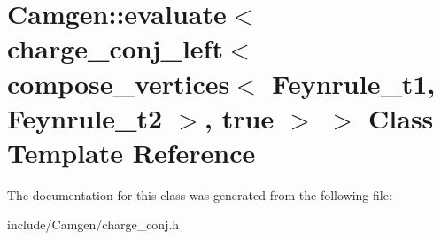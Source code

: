 \hypertarget{a00146}{}\section{Camgen\+:\+:evaluate$<$ charge\+\_\+conj\+\_\+left$<$ compose\+\_\+vertices$<$ Feynrule\+\_\+t1, Feynrule\+\_\+t2 $>$, true $>$ $>$ Class Template Reference}
\label{a00146}


The documentation for this class was generated from the following file\+:\begin{DoxyCompactItemize}
\item 
include/\+Camgen/charge\+\_\+conj.\+h\end{DoxyCompactItemize}
